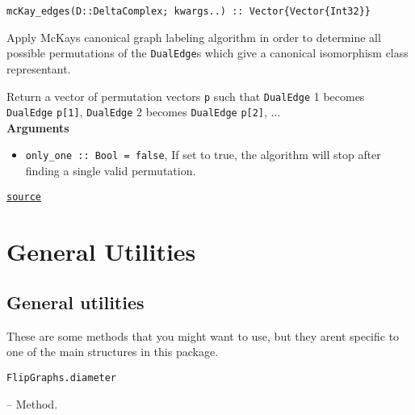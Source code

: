 \begin{adjustwidth}{2em}{0pt}


\begin{verbatim}
mcKay_edges(D::DeltaComplex; kwargs..) :: Vector{Vector{Int32}}
\end{verbatim}

Apply McKay{\textquotesingle}s canonical graph labeling algorithm in order to determine all possible permutations  of the \texttt{DualEdge}s which give a canonical isomorphism class representant.

Return a vector of permutation vectors \texttt{p} such that \texttt{DualEdge} 1 becomes \texttt{DualEdge} \texttt{p[1]}, \texttt{DualEdge} 2 becomes \texttt{DualEdge} \texttt{p[2]}, ...\\


\textbf{Arguments}

\begin{itemize}
\item \texttt{only\_one :: Bool = false}, If set to true, the algorithm will stop after finding a single valid permutation.

\end{itemize}


\href{https://github.com/schto223/FlipGraphs.jl/blob/490c01a7adf74b42f27dda05099165c47ae8133e/src/flipGraph.jl#L853-L863}{\texttt{source}}


\end{adjustwidth}



\part{General Utilities}


\chapter{General utilities}



\label{15108808020745066681}{}


These are some methods that you might want to use, but they aren{\textquotesingle}t specific to one of the main structures in this package.


\hypertarget{14583114515296484060}{\texttt{FlipGraphs.diameter}}  -- {Method.}

